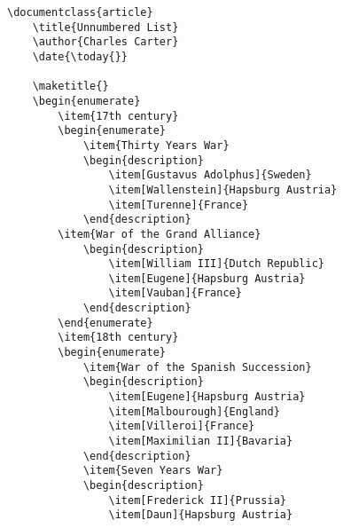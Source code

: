         \begin{verbatim}
\documentclass{article}
    \title{Unnumbered List}
    \author{Charles Carter}
    \date{\today{}}
 
    \maketitle{}
    \begin{enumerate}
        \item{17th century}
        \begin{enumerate}
            \item{Thirty Years War}
            \begin{description}
                \item[Gustavus Adolphus]{Sweden}
                \item[Wallenstein]{Hapsburg Austria}
                \item[Turenne]{France}
            \end{description}
        \item{War of the Grand Alliance}
            \begin{description}
                \item[William III]{Dutch Republic}
                \item[Eugene]{Hapsburg Austria}
                \item[Vauban]{France}
            \end{description}
        \end{enumerate}
        \item{18th century}
        \begin{enumerate}
            \item{War of the Spanish Succession}
            \begin{description}
                \item[Eugene]{Hapsburg Austria}
                \item[Malbourough]{England}
                \item[Villeroi]{France}
                \item[Maximilian II]{Bavaria}
            \end{description}
            \item{Seven Years War}
            \begin{description}
                \item[Frederick II]{Prussia}
                \item[Daun]{Hapsburg Austria}

\end{verbatim}
